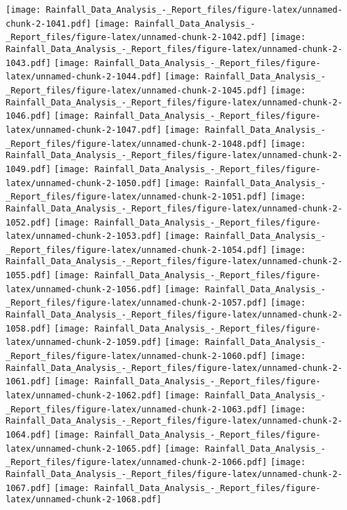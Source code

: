 \documentclass[
]{article}
\begin{document}
\texttt{[image: Rainfall\_Data\_Analysis\_-\_Report\_files/figure-latex/unnamed-chunk-2-1041.pdf]}
\texttt{[image: Rainfall\_Data\_Analysis\_-\_Report\_files/figure-latex/unnamed-chunk-2-1042.pdf]}
\texttt{[image: Rainfall\_Data\_Analysis\_-\_Report\_files/figure-latex/unnamed-chunk-2-1043.pdf]}
\texttt{[image: Rainfall\_Data\_Analysis\_-\_Report\_files/figure-latex/unnamed-chunk-2-1044.pdf]}
\texttt{[image: Rainfall\_Data\_Analysis\_-\_Report\_files/figure-latex/unnamed-chunk-2-1045.pdf]}
\texttt{[image: Rainfall\_Data\_Analysis\_-\_Report\_files/figure-latex/unnamed-chunk-2-1046.pdf]}
\texttt{[image: Rainfall\_Data\_Analysis\_-\_Report\_files/figure-latex/unnamed-chunk-2-1047.pdf]}
\texttt{[image: Rainfall\_Data\_Analysis\_-\_Report\_files/figure-latex/unnamed-chunk-2-1048.pdf]}
\texttt{[image: Rainfall\_Data\_Analysis\_-\_Report\_files/figure-latex/unnamed-chunk-2-1049.pdf]}
\texttt{[image: Rainfall\_Data\_Analysis\_-\_Report\_files/figure-latex/unnamed-chunk-2-1050.pdf]}
\texttt{[image: Rainfall\_Data\_Analysis\_-\_Report\_files/figure-latex/unnamed-chunk-2-1051.pdf]}
\texttt{[image: Rainfall\_Data\_Analysis\_-\_Report\_files/figure-latex/unnamed-chunk-2-1052.pdf]}
\texttt{[image: Rainfall\_Data\_Analysis\_-\_Report\_files/figure-latex/unnamed-chunk-2-1053.pdf]}
\texttt{[image: Rainfall\_Data\_Analysis\_-\_Report\_files/figure-latex/unnamed-chunk-2-1054.pdf]}
\texttt{[image: Rainfall\_Data\_Analysis\_-\_Report\_files/figure-latex/unnamed-chunk-2-1055.pdf]}
\texttt{[image: Rainfall\_Data\_Analysis\_-\_Report\_files/figure-latex/unnamed-chunk-2-1056.pdf]}
\texttt{[image: Rainfall\_Data\_Analysis\_-\_Report\_files/figure-latex/unnamed-chunk-2-1057.pdf]}
\texttt{[image: Rainfall\_Data\_Analysis\_-\_Report\_files/figure-latex/unnamed-chunk-2-1058.pdf]}
\texttt{[image: Rainfall\_Data\_Analysis\_-\_Report\_files/figure-latex/unnamed-chunk-2-1059.pdf]}
\texttt{[image: Rainfall\_Data\_Analysis\_-\_Report\_files/figure-latex/unnamed-chunk-2-1060.pdf]}
\texttt{[image: Rainfall\_Data\_Analysis\_-\_Report\_files/figure-latex/unnamed-chunk-2-1061.pdf]}
\texttt{[image: Rainfall\_Data\_Analysis\_-\_Report\_files/figure-latex/unnamed-chunk-2-1062.pdf]}
\texttt{[image: Rainfall\_Data\_Analysis\_-\_Report\_files/figure-latex/unnamed-chunk-2-1063.pdf]}
\texttt{[image: Rainfall\_Data\_Analysis\_-\_Report\_files/figure-latex/unnamed-chunk-2-1064.pdf]}
\texttt{[image: Rainfall\_Data\_Analysis\_-\_Report\_files/figure-latex/unnamed-chunk-2-1065.pdf]}
\texttt{[image: Rainfall\_Data\_Analysis\_-\_Report\_files/figure-latex/unnamed-chunk-2-1066.pdf]}
\texttt{[image: Rainfall\_Data\_Analysis\_-\_Report\_files/figure-latex/unnamed-chunk-2-1067.pdf]}
\texttt{[image: Rainfall\_Data\_Analysis\_-\_Report\_files/figure-latex/unnamed-chunk-2-1068.pdf]}
\end{document}
